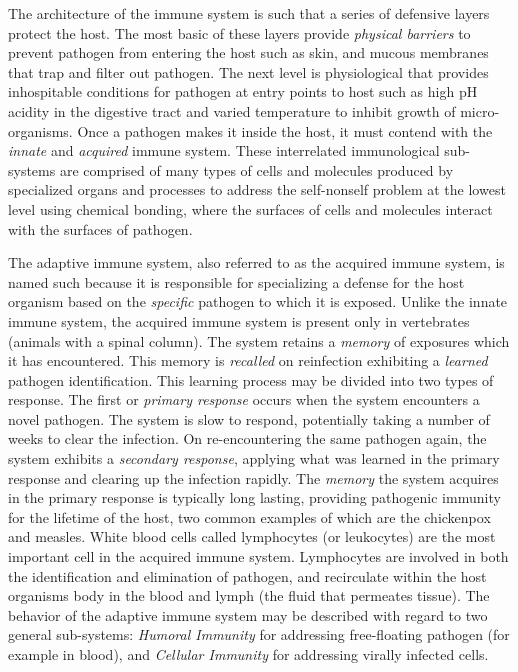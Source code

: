 \documentclass[a4paper, 11pt]{article}
\begin{document}
The architecture of the immune system is such that a series of defensive layers protect the host. The most basic of these layers provide \emph{physical barriers} to prevent pathogen from entering the host such as skin, and mucous membranes that trap and filter out pathogen. The next level is physiological that provides inhospitable conditions for pathogen at entry points to host such as high pH acidity in the digestive tract and varied temperature to inhibit growth of micro-organisms. Once a pathogen makes it inside the host, it must contend with the \emph{innate} and \emph{acquired} immune system. These interrelated immunological sub-systems are comprised of many types of cells  and molecules produced by specialized organs and processes to address the self-nonself problem at the lowest level using chemical bonding, where the surfaces of cells and molecules interact with the surfaces of pathogen.

The adaptive immune system, also referred to as the acquired immune system, is named such because it is responsible for specializing a defense for the host organism based on the \emph{specific} pathogen to which it is exposed. Unlike the innate immune system, the acquired immune system is present only in vertebrates (animals with a spinal column). The system retains a \emph{memory} of exposures which it has encountered. This memory is \emph{recalled} on reinfection exhibiting a \emph{learned} pathogen identification. This learning process may be divided into two types of response. The first or \emph{primary response} occurs when the system encounters a novel pathogen. The system is slow to respond, potentially taking a number of weeks to clear the infection. On re-encountering the same pathogen again, the system exhibits a \emph{secondary response}, applying what was learned in the primary response and clearing up the infection rapidly. The \emph{memory} the system acquires in the primary response is typically long lasting, providing pathogenic immunity for the lifetime of the host, two common examples of which are the chickenpox and measles. White blood cells called lymphocytes (or leukocytes) are the most important cell in the acquired immune system. Lymphocytes are involved in both the identification and elimination of pathogen, and recirculate within the host organisms body in the blood and lymph (the fluid that permeates tissue). The behavior of the adaptive immune system may be described with regard to two general sub-systems: \emph{Humoral Immunity} for addressing free-floating pathogen (for example in blood), and \emph{Cellular Immunity} for addressing virally infected cells.
\end{document}
